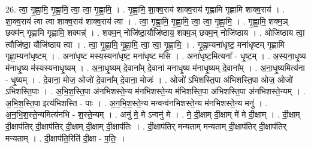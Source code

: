 \documentclass[17pt]{extarticle}
\begin{document}
26. त्वा॒ गृ॒ह्णा॒मि॒ गृ॒ह्णा॒मि॒ त्वा॒ त्वा॒ गृ॒ह्णा॒मि॒ । . गृ॒ह्णा॒मि॒ शा॒क्व॒राय॑ शाक्व॒राय॑ गृह्णामि गृह्णामि शाक्व॒राय॑ । . शा॒क्व॒राय॑ त्वा त्वा शाक्व॒राय॑ शाक्व॒राय॑ त्वा । . त्वा॒ गृ॒ह्णा॒मि॒ गृ॒ह्णा॒मि॒ त्वा॒ त्वा॒ गृ॒ह्णा॒मि॒ । . गृ॒ह्णा॒मि॒ शक्म॒ञ् छक्म॑न् गृह्णामि गृह्णामि॒ शक्मन्न्॑ । . शक्म॒न् नोजि॑ष्ठा॒यौजि॑ष्ठाय॒ शक्म॒ञ् छक्म॒न् नोजि॑ष्ठाय । . ओजि॑ष्ठाय त्वा॒ त्वौजि॑ष्ठा॒ यौजि॑ष्ठाय त्वा । . त्वा॒ गृ॒ह्णा॒मि॒ गृ॒ह्णा॒मि॒ त्वा॒ त्वा॒ गृ॒ह्णा॒मि॒ । . गृ॒ह्णा॒म्यना॑धृष्ट॒ मना॑धृष्टम् गृह्णामि गृह्णा॒म्यना॑धृष्टम् । . अना॑धृष्ट मस्य॒स्यना॑धृष्ट॒ मना॑धृष्ट मसि । . अना॑धृष्ट॒मित्यना᳚ - धृ॒ष्ट॒म् । . अ॒स्य॒ना॒धृ॒ष्य म॑नाधृ॒ष्य म॑स्यस्यनाधृ॒ष्यम् । . अ॒ना॒धृ॒ष्यम् दे॒वाना᳚म् दे॒वाना॑ मनाधृ॒ष्य म॑नाधृ॒ष्यम् दे॒वाना᳚म् । . अ॒ना॒धृ॒ष्यमित्य॑ना - धृ॒ष्यम् । . दे॒वाना॒ मोज॒ ओजो॑ दे॒वाना᳚म् दे॒वाना॒ मोजः॑ । . ओजो॑ ऽभिशस्ति॒पा अ॑भिशस्ति॒पा ओज॒ ओजो॑ ऽभिशस्ति॒पाः । . अ॒भि॒श॒स्ति॒पा अ॑नभिशस्ते॒न्य म॑नभिशस्ते॒न्य म॑भिशस्ति॒पा अ॑भिशस्ति॒पा अ॑नभिशस्ते॒न्यम् । . अ॒भि॒श॒स्ति॒पा इत्य॑भिशस्ति - पाः । . अ॒न॒भि॒श॒स्ते॒न्य मन्वन्व॑नभिशस्ते॒न्य म॑नभिशस्ते॒न्य मनु॑ । . अ॒न॒भि॒श॒स्ते॒न्यमित्य॑नभि - श॒स्ते॒न्यम् । . अनु॑ मे॒ मे ऽन्वनु॑ मे । . मे॒ दी॒क्षाम् दी॒क्षाम् मे॑ मे दी॒क्षाम् । . दी॒क्षाम् दी॒क्षाप॑तिर् दी॒क्षाप॑तिर् दी॒क्षाम् दी॒क्षाम् दी॒क्षाप॑तिः । . दी॒क्षाप॑तिर् मन्यताम् मन्यताम् दी॒क्षाप॑तिर् दी॒क्षाप॑तिर् मन्यताम् । . दी॒क्षाप॑ति॒रिति॑ दी॒क्षा - प॒तिः॒ । \newline
\end{document}
